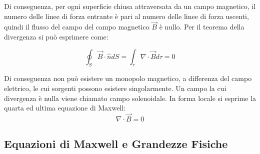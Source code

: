 \documentclass{article}
\numberwithin{equation}{subsection}
\begin{document}
\begin{center}
\end{center}

Di conseguenza, per ogni superficie chiusa attraversata da un campo magnetico, il numero delle linee di forza entrante è pari al numero delle linee di forza uscenti, quindi 
il flusso del campo del campo magnetico $\vec{B}$ è nullo. Per il teorema della divergenza si può esprimere come:

\begin{equation}
    \displaystyle\oint_{S}\vec{B}\cdot\hat{n}dS=\int_{\tau}\nabla\cdot\vec{B}d\tau=0
\end{equation}

Di conseguenza non può esistere un monopolo magnetico, a differenza del campo elettrico, le cui sorgenti possono esistere singolarmente. Un campo la cui divergenza è nulla 
viene chiamato campo solenoidale. In forma locale si esprime la quarta ed ultima equazione di Maxwell:
\begin{equation}
    \nabla\cdot\vec{B}=0
\end{equation}

\subsection{Equazioni di Maxwell e Grandezze Fisiche}
\end{document}
